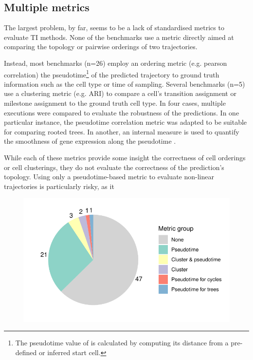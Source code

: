 \subsection{Multiple metrics}
The largest problem, by far, seems to be a lack of standardised metrics to evaluate TI methods. None of the benchmarks use a metric directly aimed at comparing the topology or pairwise orderings of two trajectories. 

Instead, most benchmarks (n=26) employ an ordering metric (e.g. pearson correlation) the pseudotime\footnote{The pseudotime value of is calculated by computing its distance from a pre-defined or inferred start cell.} of the predicted trajectory to ground truth information such as the cell type or time of sampling. Several benchmarks (n=5) use a clustering metric (e.g. ARI) to compare a cell's transition assignment or milestone assignment to the ground truth cell type. In four cases, multiple executions were compared to evaluate the robustness of the predictions.
In one particular instance, the pseudotime correlation metric was adapted to be suitable for comparing rooted trees\cite{street_slingshotcelllineage_2018}. In another, an internal measure is used to quantify the smoothness of gene expression along the pseudotime \cite{darocha_reconstructioncomplexsinglecell_2018}.

While each of these metrics provide some insight the correctness of cell orderings or cell clusterings, they do not evaluate the correctness of the prediction's topology. Using only a pseudotime-based metric to evaluate non-linear trajectories is particularly risky, as it 

\begin{figure}[htb!]
	\centering
	\includegraphics[width=.5\linewidth]{fig/metrics.pdf} 
	\caption{}
	\label{fig:metrics}
\end{figure}


